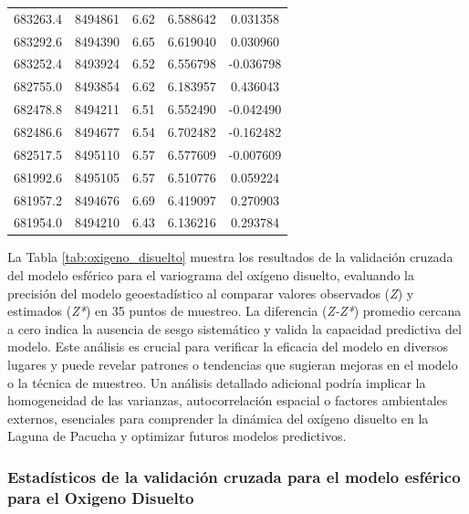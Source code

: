\begin{table}[!htb]
\begin{tabular}{ccccc}
683263.4 & 8494861 & 6.62 & 6.588642 & 0.031358 \\
683292.6 & 8494390 & 6.65 & 6.619040 & 0.030960 \\
683252.4 & 8493924 & 6.52 & 6.556798 & -0.036798 \\
682755.0 & 8493854 & 6.62 & 6.183957 & 0.436043 \\
682478.8 & 8494211 & 6.51 & 6.552490 & -0.042490 \\
682486.6 & 8494677 & 6.54 & 6.702482 & -0.162482 \\
682517.5 & 8495110 & 6.57 & 6.577609 & -0.007609 \\
681992.6 & 8495105 & 6.57 & 6.510776 & 0.059224 \\
681957.2 & 8494676 & 6.69 & 6.419097 & 0.270903 \\
681954.0 & 8494210 & 6.43 & 6.136216 & 0.293784 \\ \hline
\end{tabular}
\end{table}

La Tabla \ref{tab:oxigeno_disuelto} muestra los resultados de la validación cruzada del modelo esférico para el variograma del oxígeno disuelto, evaluando la precisión del modelo geoestadístico al comparar valores observados (\textit{Z}) y estimados (\textit{Z*}) en 35 puntos de muestreo. La diferencia (\textit{Z-Z*}) promedio cercana a cero indica la ausencia de sesgo sistemático y valida la capacidad predictiva del modelo. Este análisis es crucial para verificar la eficacia del modelo en diversos lugares y puede revelar patrones o tendencias que sugieran mejoras en el modelo o la técnica de muestreo. Un análisis detallado adicional podría implicar la homogeneidad de las varianzas, autocorrelación espacial o factores ambientales externos, esenciales para comprender la dinámica del oxígeno disuelto en la Laguna de Pacucha y optimizar futuros modelos predictivos.

 
\subsubsection{Estadísticos de la validación cruzada para el modelo esférico para el Oxigeno Disuelto}

